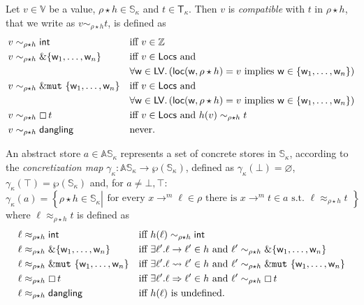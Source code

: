 \begin{definition}
  Let $v\in\mathbb{V}$ be a value, $\rho\star h\in\mathbb{S}_\kappa$ and
  $t\in\mathsf{T}_\kappa$. Then $v$ is \emph{compatible} with $t$ in $\rho\star h$,
  that we write as $v\sim_{\rho\star h}t$, is defined as
  \begin{align*}
    v&\sim_{\rho\star h}\mathsf{int} && \text{iff $v\in\mathbb{Z}$}\\
    v&\sim_{\rho\star h}\&\{\mathsf{w}_1,\ldots,\mathsf{w}_n\} && \text{iff $v\in\mathsf{Locs}$ and}\\
    &&& \forall\mathsf{w}\in\mathsf{LV}.\left(\mathsf{loc}(\mathsf{w},\rho\star h)=v\text{ implies }\mathsf{w}\in\{\mathsf{w}_1,\ldots,\mathsf{w}_n\}\right)\\
    v&\sim_{\rho\star h}\&\mathtt{mut}\ \{\mathsf{w}_1,\ldots,\mathsf{w}_n\} && \text{iff $v\in\mathsf{Locs}$ and}\\
    &&& \forall\mathsf{w}\in\mathsf{LV}.\left(\mathsf{loc}(\mathsf{w},\rho\star h)=v\text{ implies }\mathsf{w}\in\{\mathsf{w}_1,\ldots,\mathsf{w}_n\}\right)\\
    v&\sim_{\rho\star h}\boxempty\,{t} && \text{iff $v\in\mathsf{Locs}$ and $h(v)\sim_{\rho\star h}t$}\\
    v&\sim_{\rho\star h}\mathsf{dangling} && \text{never.}
  \end{align*}  
\end{definition}

\begin{definition}\label{def:concretization}
  An abstract store $a\in\mathbb{AS}_\kappa$ represents a set of concrete stores
  in $\mathbb{S}_\kappa$, according to the \emph{concretization map}
  $\gamma_\kappa:\mathbb{AS}_\kappa\to\wp(\mathbb{S}_\kappa)$, defined as
  $\gamma_\kappa(\bot)=\varnothing$, $\gamma_\kappa(\top)=\wp(\mathbb{S}_\kappa)$ and,
  for $a\not=\bot,\top$:
  \[
  \gamma_\kappa(a)=\left\{\rho\star h\in\mathbb{S}_\kappa\left|\begin{array}{l}
  \text{for every }x\to^m\ell\in\rho\text{ there is }x\to^m t\in a\text{ s.t.\ }\ell\approx_{\rho\star h}t
  \end{array}
  \right.\right\}
  \]
  where $\ell\approx_{\rho\star h}t$ is defined as
  \begin{align*}
    \ell&\approx_{\rho\star h}\mathsf{int} && \text{iff $h(\ell)\sim_{\rho\star h}\mathsf{int}$}\\
    \ell&\approx_{\rho\star h}\&\{\mathsf{w}_1,\ldots,\mathsf{w}_n\} && \text{iff $\exists\ell'.\ell\to\ell'\in h$ and $\ell'\sim_{\rho\star h}\&\{\mathsf{w}_1,\ldots,\mathsf{w}_n\}$}\\
    \ell&\approx_{\rho\star h}\&\mathtt{mut}\ \{\mathsf{w}_1,\ldots,\mathsf{w}_n\} && \text{iff $\exists\ell'.\ell\leadsto\ell'\in h$ and $\ell'\sim_{\rho\star h}\&\mathtt{mut}\ \{\mathsf{w}_1,\ldots,\mathsf{w}_n\}$}\\
    \ell&\approx_{\rho\star h}\boxempty\,{t} && \text{iff $\exists\ell'.\ell\Rightarrow\ell'\in h$ and $\ell'\sim_{\rho\star h}\boxempty\,{t}$}\\
    \ell&\approx_{\rho\star h}\mathsf{dangling} && \text{iff $h(\ell)$ is undefined.}
  \end{align*}
\end{definition}


